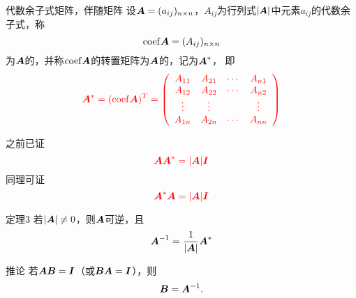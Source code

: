 \begin{frame}
  \begin{footnotesize}
    \begin{block}{代数余子式矩阵，伴随矩阵}
      设$\boldsymbol{A}=(a_{ij})_{n\times n}$，$A_{ij}$为行列式$|\boldsymbol{A}|$中元素$a_{ij}$的代数余子式，称
      $$
      \mathrm{coef} \boldsymbol{A} = (A_{ij})_{n\times n}
      $$
      为$\boldsymbol{A}$的，并称$\mathrm{coef} \boldsymbol{A}$的转置矩阵为$\boldsymbol{A}$的，记为$\boldsymbol{A}^*$，
      即
      $$\textcolor{red}{
        \boldsymbol{A}^* = (\mathrm{coef}\boldsymbol{A})^T = \left(
        \begin{array}{cccc}
          A_{11} & A_{21} & \cdots & A_{n1} \\
          A_{12} & A_{22} & \cdots & A_{n2} \\
          \vdots   & \vdots   &     & \vdots   \\
          A_{1n} & A_{2n} & \cdots & A_{nn} \\
        \end{array}
        \right)
      }
      $$
    \end{block}
    \pause
    之前已证
    $$ \textcolor{red}{
      \boldsymbol{A}\boldsymbol{A}^* = |\boldsymbol{A}|\boldsymbol{I}
    }
    $$
    \pause
    同理可证
    $$ \textcolor{red}{
      \boldsymbol{A}^*\boldsymbol{A} = |\boldsymbol{A}|\boldsymbol{I}
    }
    $$

  \end{footnotesize}
\end{frame}




\begin{frame}
  \begin{footnotesize}
    \begin{block}{定理3}
      若$|\boldsymbol{A}|\ne 0$，则$\boldsymbol{A}$可逆，且
      $$
      \boldsymbol{A}^{-1} = \frac1{|\boldsymbol{A}|} \boldsymbol{A}^*
      $$
    \end{block}
    \pause
    \proofname



    \pause 
    \vspace{2.cm}

  \end{footnotesize}
\end{frame}


\begin{frame}
  \begin{footnotesize}
    \begin{block}{推论}
      若$\boldsymbol{A}\boldsymbol{B} = \boldsymbol{I}$（或$\boldsymbol{B}\boldsymbol{A}=\boldsymbol{I}$），则
      $$
      \boldsymbol{B} = \boldsymbol{A}^{-1}.
      $$
    \end{block}
    \pause
    \proofname



    \pause 
    \vspace{2.cm}

  \end{footnotesize}
\end{frame}


